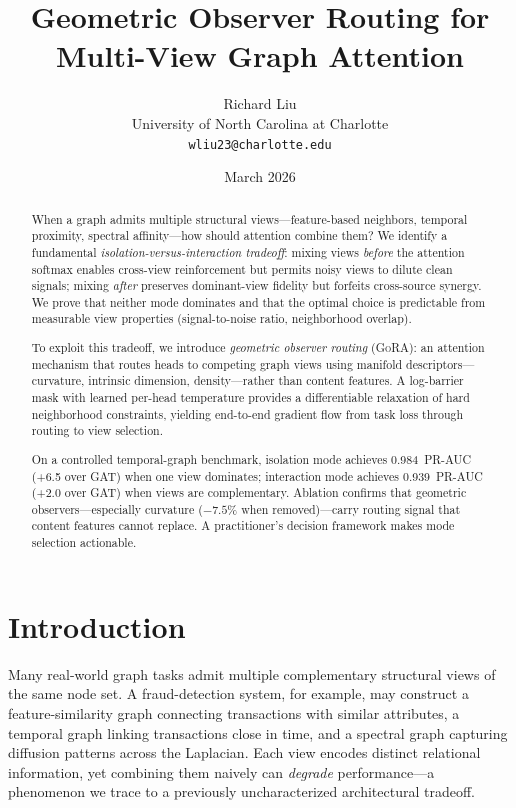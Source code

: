 \documentclass[11pt,a4paper]{article}
\title{%
  Geometric Observer Routing for\\
  Multi-View Graph Attention}
\author{%
  Richard Liu\\
  University of North Carolina at Charlotte\\
  \texttt{wliu23@charlotte.edu}
}
\date{March 2026}
\newcommand{\ours}{\textsc{GoRA}}  %
\begin{document}
\maketitle

\begin{abstract}
When a graph admits multiple structural views---feature-based neighbors,
temporal proximity, spectral affinity---how should attention combine them?
We identify a fundamental \emph{isolation-versus-interaction tradeoff}:
mixing views \emph{before} the attention softmax enables cross-view
reinforcement but permits noisy views to dilute clean signals;
mixing \emph{after} preserves dominant-view fidelity but forfeits
cross-source synergy.
We prove that neither mode dominates and that the optimal choice is
predictable from measurable view properties (signal-to-noise ratio,
neighborhood overlap).

To exploit this tradeoff, we introduce \emph{geometric observer routing}
(\ours{}): an attention mechanism that routes heads to competing graph
views using manifold descriptors---curvature, intrinsic dimension,
density---rather than content features.
A log-barrier mask with learned per-head temperature provides a
differentiable relaxation of hard neighborhood constraints, yielding
end-to-end gradient flow from task loss through routing to view
selection.

On a controlled temporal-graph benchmark, isolation mode achieves
0.984~PR-AUC (+6.5 over GAT) when one view dominates; interaction mode
achieves 0.939~PR-AUC (+2.0 over GAT) when views are complementary.
Ablation confirms that geometric observers---especially curvature
($-7.5\%$ when removed)---carry routing signal that content features
cannot replace.
A practitioner's decision framework makes mode selection actionable.
\end{abstract}

\section{Introduction}
\label{sec:intro}

Many real-world graph tasks admit multiple complementary structural
views of the same node set.
A fraud-detection system, for example, may construct a feature-similarity
graph connecting transactions with similar attributes, a temporal graph
linking transactions close in time, and a spectral graph capturing
diffusion patterns across the Laplacian.
Each view encodes distinct relational information, yet combining them
naively can \emph{degrade} performance---a phenomenon we trace to a
previously uncharacterized architectural tradeoff.
\end{document}
